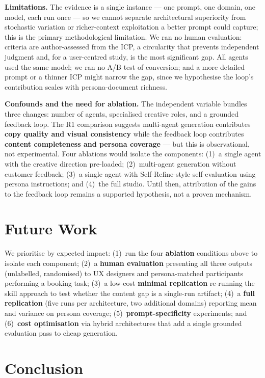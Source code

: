 \documentclass[a4paper]{llncs}
\begin{document}
\textbf{Limitations.} The evidence is a single instance --- one prompt, one
domain, one model, each run once --- so we cannot separate architectural
superiority from stochastic variation or richer-context exploitation a better
prompt could capture; this is the primary methodological limitation. We ran no
human evaluation: criteria are author-assessed from the ICP, a circularity that
prevents independent judgment and, for a user-centred study, is the most
significant gap. All agents used the same model; we ran no A/B test of
conversion; and a more detailed prompt or a thinner ICP might narrow the gap,
since we hypothesise the loop's contribution scales with persona-document
richness.

\textbf{Confounds and the need for ablation.}
\label{subsec:ablation}
The independent variable bundles three changes: number of agents, specialised
creative roles, and a grounded feedback loop. The R1 comparison suggests
multi-agent generation contributes \textbf{copy quality and visual consistency}
while the feedback loop contributes \textbf{content completeness and persona
coverage} --- but this is observational, not experimental. Four ablations would
isolate the components: (1)~a single agent with the creative direction
pre-loaded; (2)~multi-agent generation without customer feedback; (3)~a single
agent with Self-Refine-style self-evaluation using persona instructions; and
(4)~the full studio. Until then, attribution of the gains to the feedback loop
remains a supported hypothesis, not a proven mechanism.

\section{Future Work}
\label{sec:future}

We prioritise by expected impact: (1)~run the four \textbf{ablation} conditions
above to isolate each component; (2)~a \textbf{human evaluation} presenting all
three outputs (unlabelled, randomised) to UX designers and persona-matched
participants performing a booking task; (3)~a low-cost \textbf{minimal
replication} re-running the skill approach to test whether the content gap is a
single-run artifact; (4)~a \textbf{full replication} (five runs per
architecture, two additional domains) reporting mean and variance on persona
coverage; (5)~\textbf{prompt-specificity} experiments; and (6)~\textbf{cost
optimisation} via hybrid architectures that add a single grounded evaluation
pass to cheap generation.

\section{Conclusion}
\label{sec:conclusion}
\end{document}
